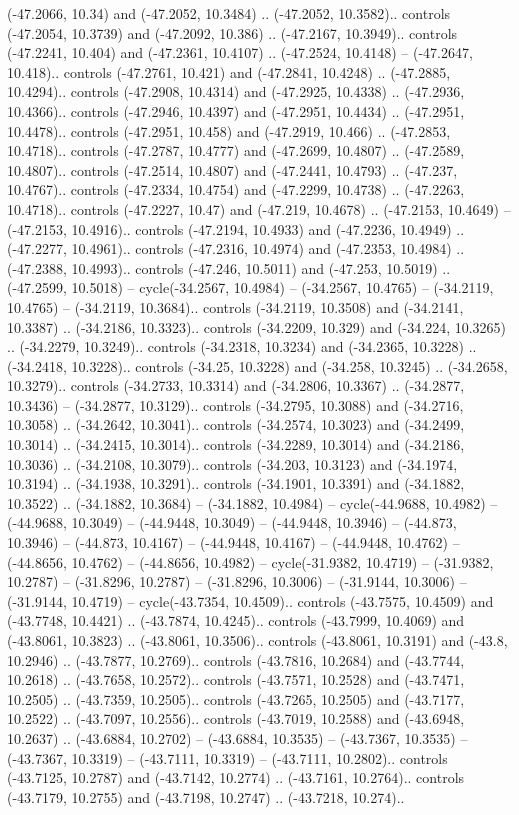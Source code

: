 \begin{scope}[shift={(2.5552, 9.9912)}]
\begin{scope}[shift={(48.1654, -14.8546)}]
(-47.2066, 10.34) and (-47.2052, 10.3484) .. (-47.2052, 10.3582).. controls (-47.2054, 10.3739) and (-47.2092, 10.386) .. (-47.2167, 10.3949).. controls (-47.2241, 10.404) and (-47.2361, 10.4107) .. (-47.2524, 10.4148) -- (-47.2647, 10.418).. controls (-47.2761, 10.421) and (-47.2841, 10.4248) .. (-47.2885, 10.4294).. controls (-47.2908, 10.4314) and (-47.2925, 10.4338) .. (-47.2936, 10.4366).. controls (-47.2946, 10.4397) and (-47.2951, 10.4434) .. (-47.2951, 10.4478).. controls (-47.2951, 10.458) and (-47.2919, 10.466) .. (-47.2853, 10.4718).. controls (-47.2787, 10.4777) and (-47.2699, 10.4807) .. (-47.2589, 10.4807).. controls (-47.2514, 10.4807) and (-47.2441, 10.4793) .. (-47.237, 10.4767).. controls (-47.2334, 10.4754) and (-47.2299, 10.4738) .. (-47.2263, 10.4718).. controls (-47.2227, 10.47) and (-47.219, 10.4678) .. (-47.2153, 10.4649) -- (-47.2153, 10.4916).. controls (-47.2194, 10.4933) and (-47.2236, 10.4949) .. (-47.2277, 10.4961).. controls (-47.2316, 10.4974) and (-47.2353, 10.4984) .. (-47.2388, 10.4993).. controls (-47.246, 10.5011) and (-47.253, 10.5019) .. (-47.2599, 10.5018) -- cycle(-34.2567, 10.4984) -- (-34.2567, 10.4765) -- (-34.2119, 10.4765) -- (-34.2119, 10.3684).. controls (-34.2119, 10.3508) and (-34.2141, 10.3387) .. (-34.2186, 10.3323).. controls (-34.2209, 10.329) and (-34.224, 10.3265) .. (-34.2279, 10.3249).. controls (-34.2318, 10.3234) and (-34.2365, 10.3228) .. (-34.2418, 10.3228).. controls (-34.25, 10.3228) and (-34.258, 10.3245) .. (-34.2658, 10.3279).. controls (-34.2733, 10.3314) and (-34.2806, 10.3367) .. (-34.2877, 10.3436) -- (-34.2877, 10.3129).. controls (-34.2795, 10.3088) and (-34.2716, 10.3058) .. (-34.2642, 10.3041).. controls (-34.2574, 10.3023) and (-34.2499, 10.3014) .. (-34.2415, 10.3014).. controls (-34.2289, 10.3014) and (-34.2186, 10.3036) .. (-34.2108, 10.3079).. controls (-34.203, 10.3123) and (-34.1974, 10.3194) .. (-34.1938, 10.3291).. controls (-34.1901, 10.3391) and (-34.1882, 10.3522) .. (-34.1882, 10.3684) -- (-34.1882, 10.4984) -- cycle(-44.9688, 10.4982) -- (-44.9688, 10.3049) -- (-44.9448, 10.3049) -- (-44.9448, 10.3946) -- (-44.873, 10.3946) -- (-44.873, 10.4167) -- (-44.9448, 10.4167) -- (-44.9448, 10.4762) -- (-44.8656, 10.4762) -- (-44.8656, 10.4982) -- cycle(-31.9382, 10.4719) -- (-31.9382, 10.2787) -- (-31.8296, 10.2787) -- (-31.8296, 10.3006) -- (-31.9144, 10.3006) -- (-31.9144, 10.4719) -- cycle(-43.7354, 10.4509).. controls (-43.7575, 10.4509) and (-43.7748, 10.4421) .. (-43.7874, 10.4245).. controls (-43.7999, 10.4069) and (-43.8061, 10.3823) .. (-43.8061, 10.3506).. controls (-43.8061, 10.3191) and (-43.8, 10.2946) .. (-43.7877, 10.2769).. controls (-43.7816, 10.2684) and (-43.7744, 10.2618) .. (-43.7658, 10.2572).. controls (-43.7571, 10.2528) and (-43.7471, 10.2505) .. (-43.7359, 10.2505).. controls (-43.7265, 10.2505) and (-43.7177, 10.2522) .. (-43.7097, 10.2556).. controls (-43.7019, 10.2588) and (-43.6948, 10.2637) .. (-43.6884, 10.2702) -- (-43.6884, 10.3535) -- (-43.7367, 10.3535) -- (-43.7367, 10.3319) -- (-43.7111, 10.3319) -- (-43.7111, 10.2802).. controls (-43.7125, 10.2787) and (-43.7142, 10.2774) .. (-43.7161, 10.2764).. controls (-43.7179, 10.2755) and (-43.7198, 10.2747) .. (-43.7218, 10.274).. 
\end{scope}
\end{scope}
